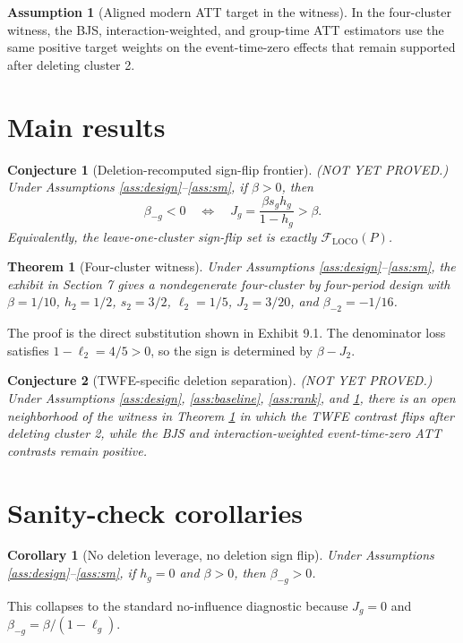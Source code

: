 \documentclass[11pt]{article}
\theoremstyle{definition}
\newtheorem{assumption}{Assumption}
\theoremstyle{plain}
\newtheorem{theorem}{Theorem}
\newtheorem{conjecture}{Conjecture}
\newtheorem{corollary}{Corollary}
\theoremstyle{remark}
\begin{document}
\begin{assumption}[Aligned modern ATT target in the witness]\label{ass:aligned}
In the four-cluster witness, the BJS, interaction-weighted, and group-time ATT estimators use the same positive target weights on the event-time-zero effects that remain supported after deleting cluster 2.
\end{assumption}

\section{Main results}
\begin{conjecture}[Deletion-recomputed sign-flip frontier]\label{conj:frontier}
(NOT YET PROVED.) Under Assumptions \ref{ass:design}--\ref{ass:sm}, if $\beta>0$, then
\[
\beta_{-g}<0\quad\Longleftrightarrow\quad J_g=\frac{\beta s_g h_g}{1-h_g}>\beta.
\]
Equivalently, the leave-one-cluster sign-flip set is exactly $\mathcal{F}_{\mathrm{LOCO}}(P)$.
\end{conjecture}

\begin{theorem}[Four-cluster witness]\label{thm:witness}
Under Assumptions \ref{ass:design}--\ref{ass:sm}, the exhibit in Section 7 gives a nondegenerate four-cluster by four-period design with $\beta=1/10$, $h_2=1/2$, $s_2=3/2$, $\ell_2=1/5$, $J_2=3/20$, and $\beta_{-2}=-1/16$.
\end{theorem}
The proof is the direct substitution shown in Exhibit 9.1. The denominator loss satisfies $1-\ell_2=4/5>0$, so the sign is determined by $\beta-J_2$.

\begin{conjecture}[TWFE-specific deletion separation]\label{conj:modern}
(NOT YET PROVED.) Under Assumptions \ref{ass:design}, \ref{ass:baseline}, \ref{ass:rank}, and \ref{ass:aligned}, there is an open neighborhood of the witness in Theorem \ref{thm:witness} in which the TWFE contrast flips after deleting cluster 2, while the BJS and interaction-weighted event-time-zero ATT contrasts remain positive.
\end{conjecture}

\section{Sanity-check corollaries}
\begin{corollary}[No deletion leverage, no deletion sign flip]\label{cor:noleverage}
Under Assumptions \ref{ass:design}--\ref{ass:sm}, if $h_g=0$ and $\beta>0$, then $\beta_{-g}>0$.
\end{corollary}
This collapses to the standard no-influence diagnostic because $J_g=0$ and $\beta_{-g}=\beta/(1-\ell_g)$.
\end{document}
